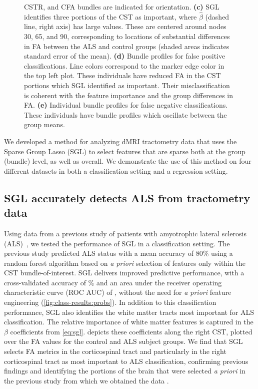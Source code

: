 \documentclass[10pt,letterpaper]{article}
\begin{document}
\begin{figure}
{        CSTR, and CFA bundles are indicated for orientation.
        {\bf (c)} SGL identifies three portions of the CST as important,
        where $\hat{\beta}$ (dashed line, right axis) has large values. These
        are centered around nodes 30, 65, and 90, corresponding to locations
        of substantial differences in FA between the ALS and control groups
        (shaded areas indicates standard error of the mean).
        {\bf (d)} Bundle profiles for false positive classifications. Line
        colors correspond to the marker edge color in the top left plot.
        These individuals have reduced FA in the CST portions which SGL
        identified as important. Their misclassification is coherent with the
        feature importance and the group differences in FA.
        {\bf (e)} Individual bundle profiles for false negative
        classifications. These individuals have bundle profiles which
        oscillate between the group means.
    }
\end{figure}

We developed a method for analyzing dMRI tractometry data that uses the Sparse
Group Lasso (SGL) to select features that are sparse both at the group (bundle) level, as well as overall.
We demonstrate the use of this method on four different datasets in
both a classification setting and a regression setting.

\subsection*{SGL accurately detects ALS from tractometry data}

Using data from a previous study of patients with amyotrophic lateral sclerosis (ALS)~\cite{sarica2017corticospinal}, we tested the performance of SGL in a
classification setting. The previous study predicted ALS status with a mean
accuracy of 80\% using a random forest algorithm based on \emph{a priori}
selection of features only within the CST bundle-of-interest.
SGL delivers improved predictive performance, with a cross-validated accuracy
of {\alsAccuracy}\% and an area under the receiver operating characteristic
curve (ROC AUC) of {\alsRocAuc}, without the need for \emph{a priori} feature
engineering (\cref{fig:class-results:probs}). In addition to this
classification performance, SGL also identifies the white matter tracts most
important for ALS classification. The relative importance of white matter
features is captured in the $\beta$ coefficients from \cref{eq:sgl}.
 depicts these coefficients along the
right CST, plotted over the FA values for the control and ALS subject groups.
We find that SGL selects FA metrics in the corticospinal tract and
particularly in the right corticospinal tract as most important to ALS
classification, confirming previous findings \cite{van2011upper,
toosy2003diffusion, sarica2014tractography, sage2007quantitative,
sage2009quantitative, karlsborg2004corticospinal, ellis1999diffusion,
cosottini2005diffusion, ciccarelli2009investigation, abe2010voxel} and
identifying the portions of the brain that were selected \emph{a priori} in
the previous study from which we obtained the data
\cite{sarica2017corticospinal}.
\end{document}
